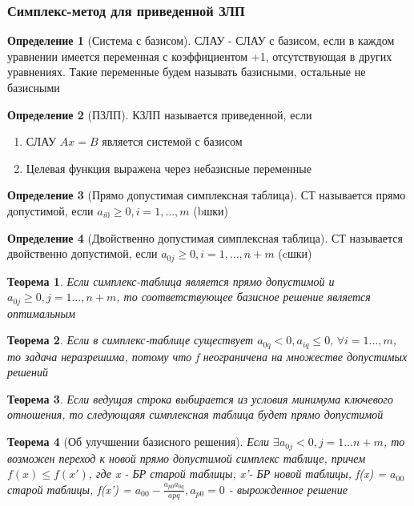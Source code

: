 \documentclass[a4paper]{article}
\newtheorem{theorem}{Теорема}[section]
\theoremstyle{definition}
\newtheorem*{definition}{Определение}
\theoremstyle{remark}
\begin{document}
\subsubsection{Симплекс-метод для приведенной ЗЛП}
\begin{definition}[Система с базисом]
    СЛАУ - СЛАУ с базисом, если в каждом уравнении имеется переменная с коэффициентом +1, отсутствующая в других уравнениях. Такие переменные будем называть базисными, остальные не базисными
\end{definition}
\begin{definition}[ПЗЛП]
    КЗЛП называется приведенной, если 
    \begin{enumerate}
        \item СЛАУ $Ax = B$ является системой с базисом
        \item Целевая функция выражена через небазисные переменные
    \end{enumerate}
\end{definition}
\begin{definition}[Прямо допустимая симплексная таблица]
    СТ называется прямо допустимой, если $a_{i0}\geq 0, i = 1, \dots, m$ (bшки)
\end{definition}
\begin{definition}[Двойственно допустимая симплексная таблица]
    СТ называется двойственно допустимой, если $a_{0j}\geq 0, i = 1, \dots, n+m$ (cшки)
\end{definition}
\begin{theorem}
    Если симплекс-таблица является прямо допустимой и $a_{0j}\geq 0, j = 1\dots, n+m$, то соответствующее базисное решение является оптимальным 
\end{theorem}
\begin{theorem}
    Если в симплекс-таблице существует $a_{0q}< 0, a_{iq}\leq 0, \, \forall i = 1\dots, m$, то задача неразрешима, потому что f неограничена на множестве допустимых решений
\end{theorem}
\begin{theorem}
    Если ведущая строка выбирается из условия минимума ключевого отношения, то следующаяя симплексная таблица будет прямо допустимой
\end{theorem}
\begin{theorem}[Об улучшении базисного решения]
    Если $\exists a_{0j}< 0, j = 1\dots n+m$, то возможен переход к новой прямо допустимой симплекс таблице, причем $f(x)\leq f(x')$, где x - БР старой таблицы, x'- БР новой таблицы,
    f(x) = $a_{00}$ старой таблицы, f(x') = $a_{00}-\frac{a_{p0}a_{0q}}{a{pq}}, a_{p0} = 0$ - вырожденное решение
\end{theorem}
\end{document}
